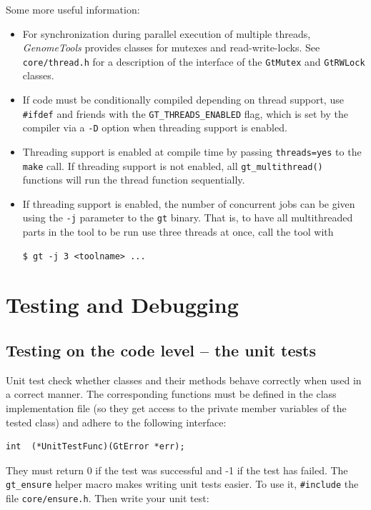 \documentclass[11pt,final]{article}
\newcommand{\keyword}[1]{\lstinline{#1}}
\newcommand{\Gt}[0]{\emph{GenomeTools}\xspace}
\begin{document}
Some more useful information:
\begin{itemize}
\item
For synchronization during parallel execution of multiple threads, \Gt provides
classes for mutexes and read-write-locks. See \keyword{core/thread.h} for a
description of the interface of the \keyword{GtMutex} and \keyword{GtRWLock}
classes.
\item
If code must be conditionally compiled depending on thread support, use
\keyword{#ifdef} and friends with the \keyword{GT_THREADS_ENABLED} flag, which
is set by the compiler via a \keyword{-D} option when threading support is
enabled.
\item
Threading support is enabled at compile time by passing \keyword{threads=yes} to
the \keyword{make} call. If threading support is not enabled, all
\keyword{gt_multithread()} functions will run the thread function sequentially.
\item
If threading support is enabled, the number of concurrent jobs can be given
using the \keyword{-j} parameter to the \keyword{gt} binary. That is, to have
all multithreaded parts in the tool to be run use three threads at once, call
the tool with

\begin{lstlisting}
$ gt -j 3 <toolname> ...
\end{lstlisting}%

\end{itemize}


\section{Testing and Debugging}
\subsection{Testing on the code level -- the unit tests}
\label{unittests}

Unit test check whether classes and their methods behave correctly when used in
a correct manner. The corresponding functions must be defined in the class
implementation file (so they get access to the private member variables of the
tested class) and adhere to the following interface:

\begin{lstlisting}
int  (*UnitTestFunc)(GtError *err);
\end{lstlisting}

They must return 0 if the test was successful and -1 if the test has failed.
The \keyword{gt_ensure} helper macro makes writing unit tests easier. To use it,
\keyword{#include} the file \keyword{core/ensure.h}. Then write your unit test:
\end{document}
